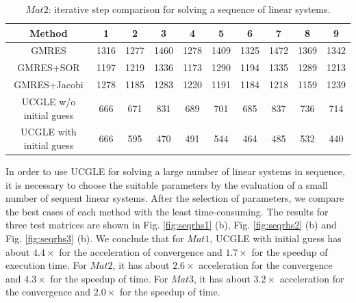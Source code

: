 \begin{table}[htbp]
	\small
	\label{tb3}
	\caption{$Mat2$:  iterative step comparison for solving a sequence of linear systems.}
	\centering
	\renewcommand{\arraystretch}{1.6}
	\begin{tabular}{c*{9}{c}}
		\toprule
		\cellcolor{gray!50}Method              & \cellcolor{gray!50}1 &  \cellcolor{gray!50}2 &  \cellcolor{gray!50}3 &  \cellcolor{gray!50}4 &  \cellcolor{gray!50}5  &  \cellcolor{gray!50}6  & \cellcolor{gray!50}7 & \cellcolor{gray!50}8 & \cellcolor{gray!50}9\\
		\midrule
		GMRES & 1316	&1277	&1460	&1278	&1409	&1325	&1472	&1369	&1342\\
		\cellcolor{gray!20}GMRES+SOR            & 	\cellcolor{gray!20}1197&		\cellcolor{gray!20}1219&		\cellcolor{gray!20}1336&		\cellcolor{gray!20}1173	&	\cellcolor{gray!20}1290	&	\cellcolor{gray!20}1194	&	\cellcolor{gray!20}1335	&	\cellcolor{gray!20}1289	&	\cellcolor{gray!20}1213\\
		GMRES+Jacobi            & 1278&	1185	&1283&	1220	&1191&	1184	&1218&	1159&	1239\\
		\cellcolor{gray!20}UCGLE w/o initial guess     & 	\cellcolor{gray!20}666	&	\cellcolor{gray!20}671	&	\cellcolor{gray!20}831	&	\cellcolor{gray!20}689	&	\cellcolor{gray!20}701	&	\cellcolor{gray!20}685	&	\cellcolor{gray!20}837	&	\cellcolor{gray!20}736	&	\cellcolor{gray!20}714\\
		UCGLE with initial guess     & 666	&595	&470	&491	&544	&464	&485	&532	&440\\
		\hline
	\end{tabular}
\end{table}

In order to use UCGLE for solving a large number of linear systems in sequence, it is necessary to choose the suitable parameters by the evaluation of a small number of sequent linear systems. After the selection of parameters, we compare the best cases of each method with the least time-consuming. The results for three test matrices are shown in Fig. \ref{fig:seqrhs1} (b), Fig. \ref{fig:seqrhs2} (b) and Fig. \ref{fig:seqrhs3} (b). We conclude that for $Mat1$, UCGLE with initial guess has about $4.4\times$ for the acceleration of convergence and $1.7\times$ for the speedup of execution time. For $Mat2$, it has about $2.6\times$ acceleration for the convergence and $4.3\times$ for the speedup of time. For $Mat3$, it has about $3.2\times$ acceleration for the convergence and $2.0\times$ for the speedup of time. 

